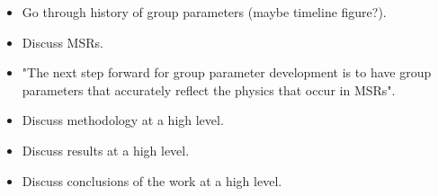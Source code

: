 \begin{itemize}

\item Go through history of group parameters (maybe timeline figure?).

\item Discuss MSRs.

\item "The next step forward for group parameter development is to have group parameters that accurately reflect the physics that occur in \glspl{MSR}".

\item Discuss methodology at a high level.

\item Discuss results at a high level.

\item Discuss conclusions of the work at a high level.

\end{itemize}